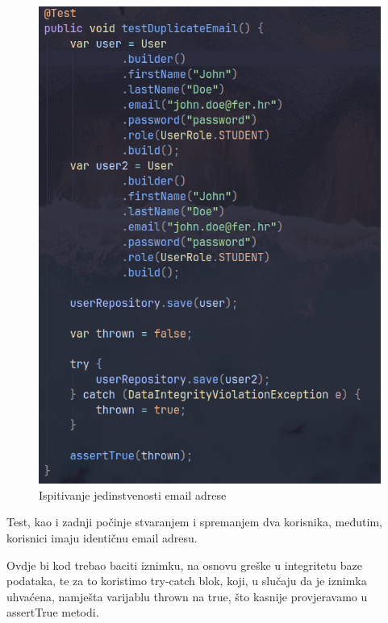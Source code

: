 \begin{figure}[H]
	\includegraphics[scale=0.6]{slike/test_3.png}
	\centering
	\caption{Ispitivanje jedinstvenosti email adrese}
	\label{fig:test_3}
\end{figure}

Test, kao i zadnji počinje stvaranjem i spremanjem dva korisnika, međutim, 
korisnici imaju identičnu email adresu.

Ovdje bi kod trebao baciti iznimku, na osnovu greške u integritetu baze 
podataka, te za to koristimo try-catch blok, koji, u slučaju da je iznimka 
uhvaćena, namješta varijablu thrown na true, što kasnije provjeravamo u 
assertTrue metodi.

